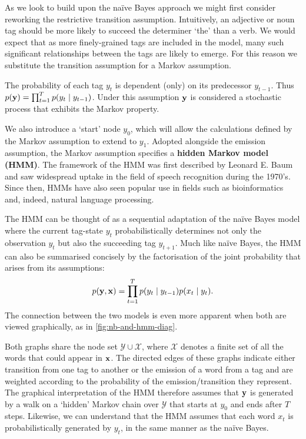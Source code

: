 \documentclass[../main.tex]{subfiles}
\begin{document}
As we look to build upon the na{\"i}ve Bayes approach we might first consider reworking the restrictive transition assumption.
Intuitively, an adjective or noun tag should be more likely to succeed the determiner `the' than a verb.
We would expect that as more finely-grained tags are included in the model, many such significant relationships between the tags are likely to emerge.
For this reason we substitute the transition assumption for a Markov assumption.
\begin{assumption} \label{ass:markov-assumption}
    The probability of each tag $y_t$ is dependent (only) on its predecessor $y_{t-1}$. Thus $p(\mathbf{y}) = \prod_{t=1}^T p(y_t \mid y_{t-1})$. Under this assumption $\mathbf{y}$ is considered a stochastic process that exhibits the Markov property.
\end{assumption}
We also introduce a `start' node $y_0$, which will allow the calculations defined by the Markov assumption to extend to $y_1$.
Adopted alongside the emission assumption, the Markov assumption specifies a \textbf{hidden Markov model (HMM)}.
The framework of the HMM was first described by Leonard E. Baum \autocite{first-hmm} and saw widespread uptake in the field of speech recognition during the 1970's. Since then, HMMs have also seen popular use in fields such as bioinformatics and, indeed, natural language processing.

The HMM can be thought of as a sequential adaptation of the na{\"i}ve Bayes model where the current tag-state $y_t$ probabilistically determines not only the observation $y_t$ but also the succeeding tag $y_{t+1}$.
Much like na{\"i}ve Bayes, the HMM can also be summarised concisely by the factorisation of the joint probability that arises from its assumptions:
\begin{equation} \label{eq:hmm-model} 
    p(\mathbf{y},\mathbf{x}) = \prod_{t=1}^T p(y_t \mid y_{t-1})p(x_t \mid y_t).
\end{equation}
The connection between the two models is even more apparent when both are viewed graphically, as in \cref{fig:nb-and-hmm-diag}.

Both graphs share the node set $\mathcal{Y} \cup \mathcal{X}$, where $\mathcal{X}$ denotes a finite set of all the words that could appear in $\mathbf{x}$.
The directed edges of these graphs indicate either transition from one tag to another or the emission of a word from a tag and are weighted according to the probability of the emission/transition they represent.
The graphical interpretation of the HMM therefore assumes that $\mathbf{y}$ is generated by a walk on a `hidden' Markov chain over $\mathcal{Y}$ that starts at $y_0$ and ends after $T$ steps.
Likewise, we can understand that the HMM assumes that each word $x_t$ is probabilistically generated by $y_t$, in the same manner as the na{\"i}ve Bayes.
\end{document}
